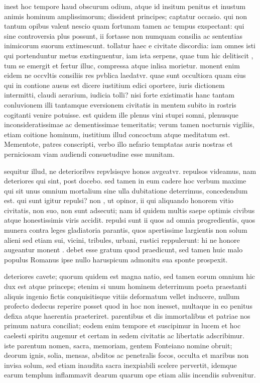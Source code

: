  inest hoc tempore haud obscurum odium, atque id insitum penitus et inustum animis hominum amplissimorum; dissident principes; captatur occasio. qui non tantum opibus valent nescio quam fortunam tamen ac tempus exspectant: qui sine controversia plus possunt, ii fortasse non numquam consilia ac sententias inimicorum suorum extimescunt. tollatur haec e civitate discordia: iam omnes isti qui portenduntur metus exstinguentur, iam ista serpens, quae tum hic delitiscit , tum se emergit et fertur illuc, compressa atque inlisa morietur. monent enim eidem ne occvltis consiliis res pvblica laedatvr. quae sunt occultiora quam eius qui in contione ausus est dicere iustitium edici oportere, iuris dictionem intermitti, claudi aerarium, iudicia tolli? nisi forte existimatis hanc tantam conluvionem illi tantamque eversionem civitatis in mentem subito in rostris cogitanti venire potuisse. est quidem ille plenus vini stupri somni, plenusque inconsideratissimae ac dementissimae temeritatis; verum tamen nocturnis vigiliis, etiam coitione hominum, iustitium illud concoctum atque meditatum est. Mementote, patres conscripti, verbo illo nefario temptatas auris nostras et perniciosam viam audiendi consuetudine esse munitam.

 sequitur illud, ne deterioribvs repvlsisqve honos avgeatvr. repulsos videamus, nam deteriores qui sint, post docebo. sed tamen in eum cadere hoc verbum maxime qui sit unus omnium mortalium sine ulla dubitatione deterrimus, concedendum est. qui sunt igitur repulsi? non , ut opinor, ii qui aliquando honorem vitio civitatis, non suo, non sunt adsecuti; nam id quidem multis saepe optimis civibus atque honestissimis viris accidit. repulsi sunt ii quos ad omnia progredientis, quos munera contra leges gladiatoria parantis, quos apertissime largientis non solum alieni sed etiam sui, vicini, tribules, urbani, rustici reppulerunt: hi ne honore augeantur monent . debet esse gratum quod praedicunt, sed tamen huic malo populus Romanus ipse nullo haruspicum admonitu sua sponte prospexit.

 deteriores cavete; quorum quidem est magna natio, sed tamen eorum omnium hic dux est atque princeps; etenim si unum hominem deterrimum poeta praestanti aliquis ingenio fictis conquisitisque vitiis deformatum vellet inducere, nullum profecto dedecus reperire posset quod in hoc non inesset, multaque in eo penitus defixa atque haerentia praeteriret. parentibus et dis immortalibus et patriae nos primum natura conciliat; eodem enim tempore et suscipimur in lucem et hoc caelesti spiritu augemur et certam in sedem civitatis ac libertatis adscribimur. iste parentum nomen, sacra, memoriam, gentem Fonteiano nomine obruit; deorum ignis, solia, mensas, abditos ac penetralis focos, occulta et maribus non invisa solum, sed etiam inaudita sacra inexpiabili scelere pervertit, idemque earum templum inflammavit dearum quarum ope etiam aliis incendiis subvenitur.

